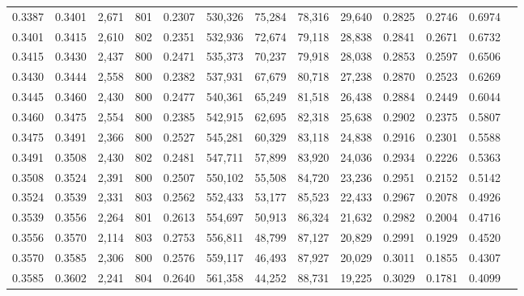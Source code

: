 \begin{tabular}{rrrrrrrrrrrrr}
0.3387 & 0.3401 &  2,671 & 801 &                                     0.2307 & 530,326 &  75,284 &  78,316 &  29,640 & 0.2825 & 0.2746 & 0.6974 \\
0.3401 & 0.3415 &  2,610 & 802 &                                     0.2351 & 532,936 &  72,674 &  79,118 &  28,838 & 0.2841 & 0.2671 & 0.6732 \\
0.3415 & 0.3430 &  2,437 & 800 &                                     0.2471 & 535,373 &  70,237 &  79,918 &  28,038 & 0.2853 & 0.2597 & 0.6506 \\
0.3430 & 0.3444 &  2,558 & 800 &                                     0.2382 & 537,931 &  67,679 &  80,718 &  27,238 & 0.2870 & 0.2523 & 0.6269 \\
0.3445 & 0.3460 &  2,430 & 800 &                                     0.2477 & 540,361 &  65,249 &  81,518 &  26,438 & 0.2884 & 0.2449 & 0.6044 \\
0.3460 & 0.3475 &  2,554 & 800 &                                     0.2385 & 542,915 &  62,695 &  82,318 &  25,638 & 0.2902 & 0.2375 & 0.5807 \\
0.3475 & 0.3491 &  2,366 & 800 &                                     0.2527 & 545,281 &  60,329 &  83,118 &  24,838 & 0.2916 & 0.2301 & 0.5588 \\
0.3491 & 0.3508 &  2,430 & 802 &                                     0.2481 & 547,711 &  57,899 &  83,920 &  24,036 & 0.2934 & 0.2226 & 0.5363 \\
0.3508 & 0.3524 &  2,391 & 800 &                                     0.2507 & 550,102 &  55,508 &  84,720 &  23,236 & 0.2951 & 0.2152 & 0.5142 \\
0.3524 & 0.3539 &  2,331 & 803 &                                     0.2562 & 552,433 &  53,177 &  85,523 &  22,433 & 0.2967 & 0.2078 & 0.4926 \\
0.3539 & 0.3556 &  2,264 & 801 &                                     0.2613 & 554,697 &  50,913 &  86,324 &  21,632 & 0.2982 & 0.2004 & 0.4716 \\
0.3556 & 0.3570 &  2,114 & 803 &                                     0.2753 & 556,811 &  48,799 &  87,127 &  20,829 & 0.2991 & 0.1929 & 0.4520 \\
0.3570 & 0.3585 &  2,306 & 800 &                                     0.2576 & 559,117 &  46,493 &  87,927 &  20,029 & 0.3011 & 0.1855 & 0.4307 \\
0.3585 & 0.3602 &  2,241 & 804 &                                     0.2640 & 561,358 &  44,252 &  88,731 &  19,225 & 0.3029 & 0.1781 & 0.4099 \\

\end{tabular}

